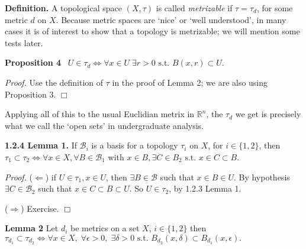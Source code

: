 \documentclass[12pt]{article}
\newcommand{\st}[0]{ \textrm{ s.t. } }
\newcommand{\rimply}[0] { \Rightarrow }
\newcommand{\limply}[0] { \Leftarrow }
\newcommand{\lrimply}[0] { \Leftrightarrow }
\newcommand{\reals}[0] { \mathbb{R}}
\newcommand{\eps}[0] {  \epsilon }
\newcommand{\B}[0] { \mathcal{B} }
\begin{document}
\begin{flushleft}
 { \bf Definition.}  A topological space $(X, \tau)$ is called \emph{metrizable}
 if $\tau = \tau_d$, for some metric $d$ on $X$. Because metric spaces are
`nice' or `well understood', in many cases it is of interest to show that a
topology is metrizable; we will mention some tests later. \end{flushleft}



\begin{flushleft}
 { \bf Proposition 4 } \ $U \in \tau_d \lrimply \forall x \in U \; \exists r>0 \st B(x,r) \subset U$.
\end{flushleft}

\begin{flushleft}
 \emph{Proof.  }Use the definition of $\tau$ in the proof of Lemma 2;
we are  also using Proposition 3. $\Box$ \end{flushleft}




\begin{flushleft}
 Applying all of this to the usual Euclidian metrix in $\reals^n$, the $\tau_d$
we get is precisely what we call the `open sets' in undergraduate analysis.
\end{flushleft}


\begin{flushleft}
 { \bf 1.2.4 Lemma  1. }  If $\B_i$ is a basis for a topology $\tau_i$ on $X$,
for
 $i \in \{1,2\}$, then $\tau_1 \subset \tau_2 \lrimply \forall x \in X, \forall B \in \B_1$ with $x \in B, \exists C \in B_2 \st x \in C \subset B$. \\
\end{flushleft}


\begin{flushleft}
 \emph{Proof.  }($\limply$) if $U \in \tau_1, x \in U$, then $\exists B \in \B$ such that $x \in B \in U$. By hypothesis $\exists C \in \B_2$ such that
$x \in C \subset B \subset U$. So $U \in \tau_2$, by 1.2.3
Lemma 1.

($\rimply$) Exercise.
 $\Box$
\end{flushleft}



\begin{flushleft} {\bf Lemma 2 }
Let $d_i$ be metrics on a set $X$, $i \in \{ 1,2\}$ then $\tau_{d_1} \subset \tau _{d_2} \lrimply \forall x \in X, \; \forall \eps > 0, \; \exists \delta > 0 \st B_{d_2}(x, \delta) \subset B_{d_1}(x, \eps).$
\end{flushleft}
\end{document}
